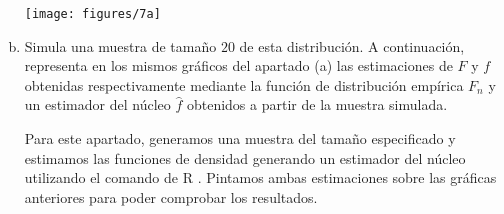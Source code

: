 \documentclass[a4paper]{article}
\begin{document}
\begin{enumerate}[a)]
\begin{Shaded}
\begin{Highlighting}[]
 \NormalTok{, } \NormalTok{)}
\end{Highlighting}
\end{Shaded}

	\texttt{[image: figures/7a]}
	
	\item Simula una muestra de tamaño $20$ de esta distribución. A continuación, representa en los mismos gráficos del apartado (a) las estimaciones de $F$ y $f$ obtenidas respectivamente mediante la función de distribución empírica $F_n$ y un estimador del núcleo $\hat f$ obtenidos a partir de la muestra simulada.
	
	Para este apartado, generamos una muestra del tamaño especificado y estimamos las funciones de densidad generando un estimador del núcleo utilizando el comando de R . Pintamos ambas estimaciones sobre las gráficas anteriores para poder comprobar los resultados.
	
\begin{Shaded}
\begin{Highlighting}[]
\NormalTok{(}\NormalTok{)}

\StringTok{ }\NormalTok{(}\NormalTok{, }\NormalTok{, }\NormalTok{)}
\StringTok{ }\NormalTok{, }\NormalTok{)}
\StringTok{ }\NormalTok{, }\NormalTok{)}
\StringTok{ }

\StringTok{ }\NormalTok{(}\NormalTok{, }\NormalTok{, }\NormalTok{)}
\StringTok{ }
\StringTok{ }\NormalTok{(}\OperatorTok{$}\OperatorTok{$}


\end{Highlighting}
\end{Shaded}
\end{enumerate}
\end{document}
